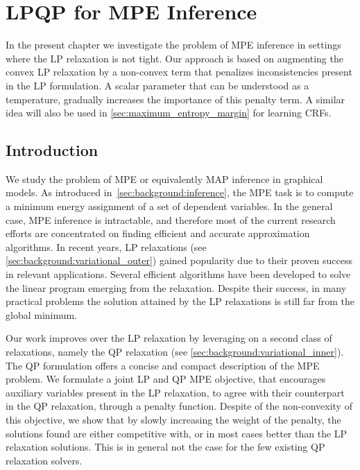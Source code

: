 \chapter{LPQP for MPE Inference}
\label{sec:lpqp}


In the present chapter we investigate the problem of \acf{MPE} inference in
settings where the \acf{LP} relaxation is not tight. Our approach is based on
augmenting the convex \ac{LP} relaxation by a
non-convex term that penalizes inconsistencies present in the \ac{LP}
formulation. A scalar parameter that can be understood as a temperature,
gradually increases the importance of this penalty term. A similar idea will
also be used in \autoref{sec:maximum_entropy_margin} for learning \acp{CRF}.


\section{Introduction}

We study the problem of \ac{MPE} or equivalently \acf{MAP} inference in graphical 
models. As introduced in~\autoref{sec:background:inference}, the \ac{MPE}
task is to compute a minimum energy assignment of a set of dependent variables.
In the general case, \ac{MPE} inference
is intractable, and therefore most of the current research efforts are concentrated 
on finding efficient and accurate approximation algorithms. In recent years, 
\acf{LP} relaxations (see \autoref{sec:background:variational_outer}) gained
popularity due to their proven success
in relevant applications. Several efficient algorithms have been developed  
to solve the linear program emerging from the relaxation. 
Despite their success, in many practical problems the solution attained by the
\ac{LP} relaxations is still far from the global minimum.

Our work improves over the \ac{LP} relaxation by leveraging on a second class of
relaxations, namely the \acf{QP} relaxation (see
\autoref{sec:background:variational_inner}). The \ac{QP} 
formulation offers a concise and compact description of the \ac{MPE} problem. 
We formulate a joint \ac{LP} and \ac{QP} \ac{MPE} objective, that encourages auxiliary variables
present in the \ac{LP} relaxation, to agree with their counterpart in the
\ac{QP} relaxation, 
through a penalty function. Despite of the non-convexity of this objective, we 
show that by slowly increasing the weight of the penalty, 
the solutions found are either competitive with, or in most cases better than 
the \ac{LP} relaxation solutions. This is in general not the case for the few existing 
\ac{QP} relaxation solvers. 

